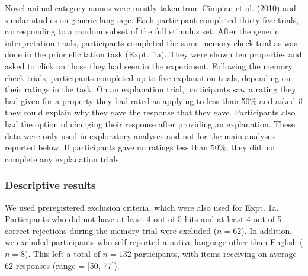 \documentclass[floatsintext,doc]{apa6}
\begin{document}
Novel animal category names were mostly taken from Cimpian et al. (2010) and similar studies on generic language.
Each participant completed thirty-five trials, corresponding to a random subset of the full stimulus set.
After the generic interpretation trials, participants completed the same memory check trial as was done in the prior elicitation task (Expt.~1a).
They were shown ten properties and asked to click on those they had seen in the experiment.
Following the memory check trials, participants completed up to five explanation trials, depending on their ratings in the task.
On an explanation trial, participants saw a rating they had given for a property they had rated as applying to less than 50\% and asked if they could explain why they gave the response that they gave.
Participants also had the option of changing their response after providing an explanation.
These data were only used in exploratory analyses and not for the main analyses reported below.
If participants gave no ratings less than 50\%, they did not complete any explanation trials.

\hypertarget{descriptive-results}{%
\subsubsection{Descriptive results}\label{descriptive-results}}

We used preregistered exclusion criteria, which were also used for Expt. 1a.
Participants who did not have at least 4 out of 5 hits and at least 4 out of 5 correct rejections during the memory trial were excluded (\(n = 62\)).
In addition, we excluded participants who self-reported a native language other than English (\(n = 8\)).
This left a total of \(n = 132\) participants, with items receiving on average 62 responses (range = {[}50, 77{]}).
\end{document}
